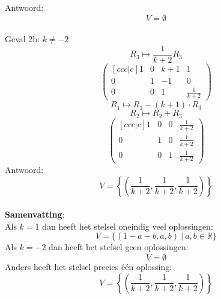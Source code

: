 \documentclass[lineaire_algebra_oplossingen.tex]{subfiles}
\begin{document}
Antwoord:
\[
V=\emptyset
\]\\
Geval 2b: $k\neq-2$\\
\[ R_3 \longmapsto \frac{1}{k+2}R_3\]
\[
\begin{pmatrix}[ccc|c]
1 &  0 &  k+1 & 1\\
0 &  1 & -1 & 0\\
0 &  0 &  1 & \frac{1}{k+2}
\end{pmatrix}
\]
\[ R_1 \longmapsto R_1 - (k+1)\cdot R_3\]
\[ R_2 \longmapsto R_2 + R_3\]
\[
\begin{pmatrix}[ccc|c]
1 &  0 &  0 & \frac{1}{k+2}\\
0 &  1 &  0 & \frac{1}{k+2}\\
0 &  0 &  1 & \frac{1}{k+2}
\end{pmatrix}
\]
Antwoord:
\[
V=\left\{\left( \frac{1}{k+2},\frac{1}{k+2},\frac{1}{k+2} \right)\right\}
\]\\
\textbf{Samenvatting}:\\
Als $k=1$ dan heeft het stelsel oneindig veel oplossingen:
\[
V=\{ (1-a-b,a,b)\ |\ a,b \in \mathbb{R}\}
\]
Als $k=-2$ dan heeft het stelsel geen oplossingen:
\[
V=\emptyset
\]
Anders heeft het stelsel precies \'e\'en oplossing:
\[
V=\left\{\left( \frac{1}{k+2},\frac{1}{k+2},\frac{1}{k+2} \right)\right\}
\]
\end{document}
